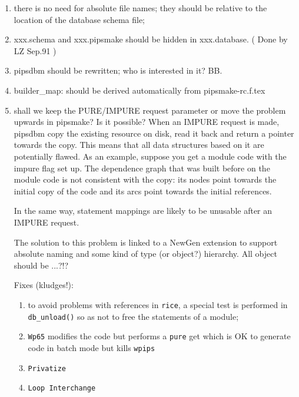 \begin{enumerate}

  \item there is no need for absolute file names; they should be relative
	to the location of the database schema file;

  \item xxx.schema and xxx.pipsmake should be hidden in xxx.database.
	( Done by LZ Sep.91 )
	
  \item pipsdbm should be rewritten; who is interested in it? BB.

  \item builder\_map: should be derived automatically from pipsmake-rc.f.tex

  \item shall we keep the PURE/IMPURE request parameter or move the problem
	upwards in pipsmake? Is it possible? When an IMPURE request is made,
	pipsdbm copy the existing resource on disk, read it back and
	return a pointer towards the copy. This means that all data structures
	based on it are potentially flawed. As an example, suppose you
	get a module code with the impure flag set up. The dependence
	graph that was built before on the module code is not consistent
	with the copy: its nodes point towards the initial copy of the
	code and its arcs point towards the initial references.

	In the same way, statement mappings are likely to be unusable
	after an IMPURE request.

	The solution to this problem is linked to a NewGen extension to
	support absolute naming and some kind of type (or object?) hierarchy.
	All object should be ...?!?

	Fixes (kludges!):

  \begin{enumerate}

    \item to avoid problems with references in \verb+rice+, a special
	test
	is performed in \verb+db_unload()+ so as not to free the
	statements
	of a module;

    \item \verb+Wp65+ modifies the code but performs a \verb+pure+
	get which is OK to generate code in batch mode but kills
	\verb+wpips+

    \item \verb+Privatize+

    \item \verb+Loop Interchange+


\end{enumerate}
\end{enumerate}
